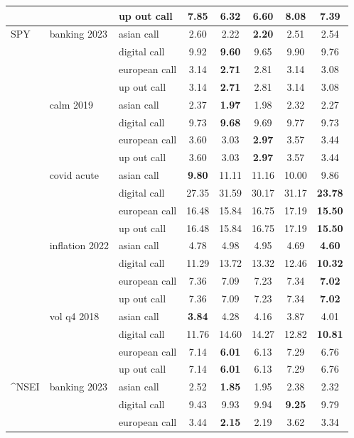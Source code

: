 \begin{table}[H]
\begin{tabular}{lllccccc}
 &  & up out call & 7.85 & \textbf{6.32} & 6.60 & 8.08 & 7.39 \\
\midrule
SPY & banking 2023 & asian call & 2.60 & 2.22 & \textbf{2.20} & 2.51 & 2.54 \\
 &  & digital call & 9.92 & \textbf{9.60} & 9.65 & 9.90 & 9.76 \\
 &  & european call & 3.14 & \textbf{2.71} & 2.81 & 3.14 & 3.08 \\
 &  & up out call & 3.14 & \textbf{2.71} & 2.81 & 3.14 & 3.08 \\
 & calm 2019 & asian call & 2.37 & \textbf{1.97} & 1.98 & 2.32 & 2.27 \\
 &  & digital call & 9.73 & \textbf{9.68} & 9.69 & 9.77 & 9.73 \\
 &  & european call & 3.60 & 3.03 & \textbf{2.97} & 3.57 & 3.44 \\
 &  & up out call & 3.60 & 3.03 & \textbf{2.97} & 3.57 & 3.44 \\
 & covid acute & asian call & \textbf{9.80} & 11.11 & 11.16 & 10.00 & 9.86 \\
 &  & digital call & 27.35 & 31.59 & 30.17 & 31.17 & \textbf{23.78} \\
 &  & european call & 16.48 & 15.84 & 16.75 & 17.19 & \textbf{15.50} \\
 &  & up out call & 16.48 & 15.84 & 16.75 & 17.19 & \textbf{15.50} \\
 & inflation 2022 & asian call & 4.78 & 4.98 & 4.95 & 4.69 & \textbf{4.60} \\
 &  & digital call & 11.29 & 13.72 & 13.32 & 12.46 & \textbf{10.32} \\
 &  & european call & 7.36 & 7.09 & 7.23 & 7.34 & \textbf{7.02} \\
 &  & up out call & 7.36 & 7.09 & 7.23 & 7.34 & \textbf{7.02} \\
 & vol q4 2018 & asian call & \textbf{3.84} & 4.28 & 4.16 & 3.87 & 4.01 \\
 &  & digital call & 11.76 & 14.60 & 14.27 & 12.82 & \textbf{10.81} \\
 &  & european call & 7.14 & \textbf{6.01} & 6.13 & 7.29 & 6.76 \\
 &  & up out call & 7.14 & \textbf{6.01} & 6.13 & 7.29 & 6.76 \\
\midrule
^NSEI & banking 2023 & asian call & 2.52 & \textbf{1.85} & 1.95 & 2.38 & 2.32 \\
 &  & digital call & 9.43 & 9.93 & 9.94 & \textbf{9.25} & 9.79 \\
 &  & european call & 3.44 & \textbf{2.15} & 2.19 & 3.62 & 3.34 \\

\end{tabular}
\end{table}

